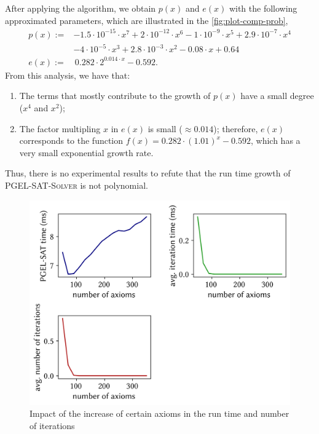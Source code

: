 After applying the algorithm, we obtain $p(x)$ and $e(x)$ with the following approximated parameters, which are illustrated in the \autoref{fig:plot-comp-prob},
\begin{align*}
  p(x) :=& -1.5  \cdot  10^{-15} \cdot x^7 
        + 2 \cdot 10^{-12} \cdot x^6 
        - 1 \cdot 10^{-9} \cdot x^5 
        + 2.9 \cdot 10^{-7} \cdot x^4\\ 
        &- 4 \cdot 10^{-5} \cdot x^3 
        + 2.8  \cdot  10^{-3}\cdot x^2 
        - 0.08 \cdot x 
        + 0.64\\
  e(x) :=& \, 0.282 \cdot 2^{0.014 \cdot x} - 0.592.
\end{align*}
From this analysis, we have that:
\begin{enumerate}[label=(\alph*)]
  \item The terms that mostly contribute to the growth of $p(x)$ have a small degree ($x^4$ and $x^2$);
  \item The factor multipling $x$ in $e(x)$ is small ($\approx 0.014$); therefore, $e(x)$ corresponds to the function $f(x) = 0.282 \cdot (1.01)^{x} - 0.592$, which has a very small exponential growth rate.
\end{enumerate}
Thus, there is no experimental results to refute that the run time growth of \textsc{PGEL-SAT-Solver} is not polynomial. 

\begin{figure}[ht]
  \centering
  \includegraphics[width=.75\textwidth]{../img/plot-comp1-0}
  \caption{Impact of the increase of certain axioms in the run time and number of iterations}
  \label{fig:plot-comp-1}
\end{figure}

